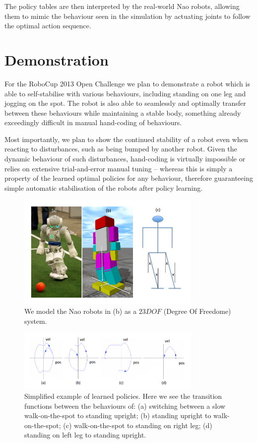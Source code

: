 The policy tables are then interpreted by the real-world Nao robots, allowing them to mimic the behaviour seen in the simulation by actuating joints to follow the optimal action sequence.

\section{Demonstration}
For the RoboCup 2013 Open Challenge we plan to demonstrate a robot which is able to self-stabilise with various behaviours, including standing on one leg and jogging on the spot. The robot is also able to seamlessly and optimally transfer between these behaviours while maintaining a stable body, something already exceedingly difficult in manual hand-coding of behaviours.

Most importantly, we plan to show the continued stability of a robot even when reacting to disturbances, such as being bumped by another robot. Given the dynamic behaviour of such disturbances, hand-coding is virtually impossible or relies on extensive trial-and-error manual tuning -- whereas this is simply a property of the learned optimal policies for any behaviour, therefore guaranteeing simple automatic stabilisation of the robots after policy learning.

\begin{figure}[!t]
\centering
\includegraphics[width=3.5in]{img/RL_lean.png}
\caption{We model the Nao robots in (b) as a $23 DOF$ (Degree Of Freedome) system. \cite{bernhard_rl}}
\label{fig:lean}
\end{figure}


\begin{figure}[!t]
\centering
\includegraphics[width=3.5in]{img/RL_policies.png}
\caption{Simplified example of learned policies. Here we see the transition functions between the behaviours of: (a) switching between a slow walk-on-the-spot to standing upright; (b) standing upright to walk-on-the-spot; (c) walk-on-the-spot to standing on right leg; (d) standing on left leg to standing upright.}
\label{fig:policy}
\end{figure}




